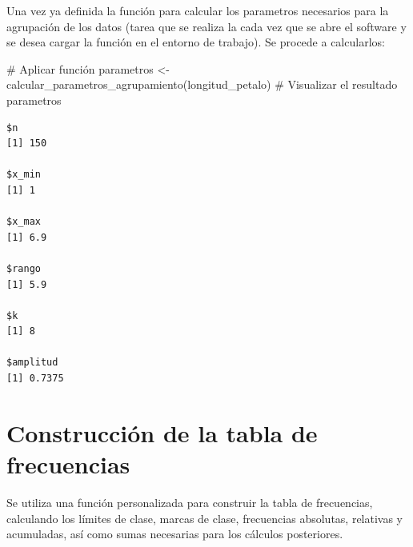 \documentclass[
  spanish,
  letterpaper,
]{book}
\newenvironment{Shaded}{\begin{snugshade}}{\end{snugshade}}
\newcommand{\CommentTok}[1]{\textcolor[rgb]{0.37,0.37,0.37}{#1}}
\newcommand{\FunctionTok}[1]{\textcolor[rgb]{0.28,0.35,0.67}{#1}}
\newcommand{\NormalTok}[1]{\textcolor[rgb]{0.00,0.23,0.31}{#1}}
\newcommand{\OtherTok}[1]{\textcolor[rgb]{0.00,0.23,0.31}{#1}}
\begin{document}
Una vez ya definida la función para calcular los parametros necesarios
para la agrupación de los datos (tarea que se realiza la cada vez que se
abre el software y se desea cargar la función en el entorno de trabajo).
Se procede a calcularlos:

\begin{Shaded}
\begin{Highlighting}[]
\CommentTok{\# Aplicar función}
\NormalTok{parametros }\OtherTok{\textless{}{-}} \FunctionTok{calcular\_parametros\_agrupamiento}\NormalTok{(longitud\_petalo)}
\CommentTok{\# Visualizar el resultado}
\NormalTok{parametros}
\end{Highlighting}
\end{Shaded}

\begin{verbatim}
$n
[1] 150

$x_min
[1] 1

$x_max
[1] 6.9

$rango
[1] 5.9

$k
[1] 8

$amplitud
[1] 0.7375
\end{verbatim}

\section{Construcción de la tabla de
frecuencias}\label{construcciuxf3n-de-la-tabla-de-frecuencias-1}

Se utiliza una función personalizada para construir la tabla de
frecuencias, calculando los límites de clase, marcas de clase,
frecuencias absolutas, relativas y acumuladas, así como sumas necesarias
para los cálculos posteriores.
\end{document}
